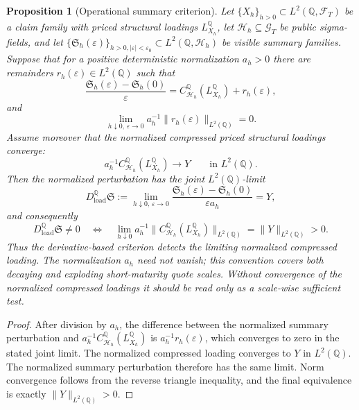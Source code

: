\documentclass[11pt,a4paper]{amsart}
\theoremstyle{plain}
\newtheorem{proposition}[theorem]{Proposition}
\theoremstyle{definition}
\theoremstyle{remark}
\newcommand{\QQ}{\mathbb{Q}}
\newcommand{\cF}{\mathcal{F}}
\newcommand{\cG}{\mathcal{G}}
\newcommand{\cH}{\mathcal{H}}
\begin{document}
\begin{proposition}[Operational summary criterion]\label{prop:summary-criterion}
Let \(\{X_h\}_{h>0}\subset L^2(\QQ,\cF_T)\) be a claim family with priced structural loadings
\(L_{X_h}^\QQ\), let \(\cH_h\subseteq\cG_T\) be public sigma-fields, and let
\(\{\mathfrak S_h(\varepsilon)\}_{h>0,|\varepsilon|<\varepsilon_0}\subset L^2(\QQ,\cH_h)\) be
visible summary families.  Suppose that for a positive deterministic normalization \(a_h>0\) there are
remainders \(r_h(\varepsilon)\in L^2(\QQ)\) such that
\[
        \frac{\mathfrak S_h(\varepsilon)-\mathfrak S_h(0)}{\varepsilon}
        =
        C_{\cH_h}^{\QQ}(L_{X_h}^\QQ)
        +
        r_h(\varepsilon),
\]
and
\[
        \lim_{h\downarrow0,\,\varepsilon\to0}
        a_h^{-1}\|r_h(\varepsilon)\|_{L^2(\QQ)}=0.
\]
Assume moreover that the normalized compressed priced structural loadings converge:
\[
        a_h^{-1}C_{\cH_h}^{\QQ}(L_{X_h}^\QQ)
        \longrightarrow
        Y
        \qquad\text{in }L^2(\QQ).
\]
Then the normalized perturbation has the joint \(L^2(\QQ)\)-limit
\[
        D_{\mathrm{load}}^\QQ\mathfrak S
        :=
        \lim_{h\downarrow0,\,\varepsilon\to0}
        \frac{\mathfrak S_h(\varepsilon)-\mathfrak S_h(0)}{\varepsilon a_h}
        =Y,
\]
and consequently
\[
        D_{\mathrm{load}}^\QQ\mathfrak S\neq0
        \quad\Longleftrightarrow\quad
        \lim_{h\downarrow0}
        a_h^{-1}\|C_{\cH_h}^{\QQ}(L_{X_h}^\QQ)\|_{L^2(\QQ)}
        =
        \|Y\|_{L^2(\QQ)}>0.
\]
Thus the derivative-based criterion detects the limiting normalized compressed loading.
The normalization \(a_h\) need not vanish; this convention covers both decaying and exploding
short-maturity quote scales.  Without convergence of the normalized compressed loadings it should
be read only as a scale-wise sufficient test.
\end{proposition}

\begin{proof}
After division by \(a_h\), the difference between the normalized summary perturbation and
\(a_h^{-1}C_{\cH_h}^{\QQ}(L_{X_h}^\QQ)\) is \(a_h^{-1}r_h(\varepsilon)\), which converges to zero
in the stated joint limit.  The normalized compressed loading converges to \(Y\) in \(L^2(\QQ)\).
The normalized summary perturbation therefore has the same limit.  Norm convergence follows from
the reverse triangle inequality, and the final equivalence is exactly \(\|Y\|_{L^2(\QQ)}>0\).
\end{proof}
\end{document}
